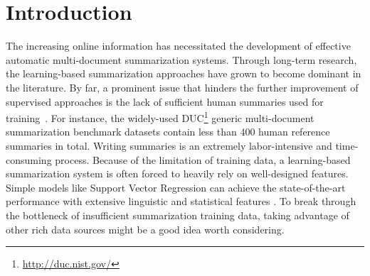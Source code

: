\documentclass[letterpaper]{article}
\begin{document}
\section{Introduction}
The increasing online information has necessitated the development of effective automatic multi-document summarization systems.
Through long-term research, the learning-based summarization approaches have grown to become dominant in the literature. 
By far, a prominent issue that hinders the further improvement of supervised approaches is the lack of sufficient human summaries used for training~\cite{ziqiang2016tgsum}.
For instance, the widely-used DUC\footnote{\url{http://duc.nist.gov/}} generic multi-document summarization benchmark datasets contain less than 400 human reference summaries in total.
Writing summaries is an extremely labor-intensive and time-consuming process. 
Because of the limitation of training data, a learning-based summarization system is often forced to heavily rely on well-designed features. 
Simple models like Support Vector Regression can achieve the state-of-the-art performance with extensive linguistic and statistical features \cite{hong2014improving}.
To break through the bottleneck of insufficient summarization training data, taking advantage of other rich data sources might be a good idea worth considering.
\end{document}
